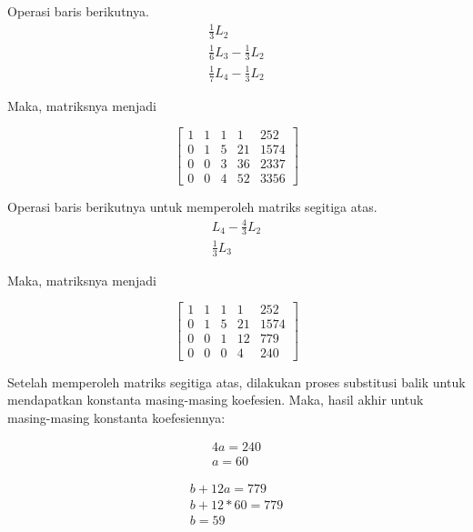 Operasi baris berikutnya.
\begin{align*}
	\frac{1}{3}L_2 \\
	\frac{1}{6}L_3 - \frac{1}{3}L_2 \\
	\frac{1}{7}L_4 - \frac{1}{3}L_2
\end{align*}

Maka, matriksnya menjadi

\begin{center}
	\setlength\arraycolsep{15pt}
	\[
	\begin{bmatrix}
			1 	& 1 	& 1 	& 1 		& 252 		\\[1em]
			0 	& 1 	& 5 	& 21 		& 1574			\\[1em]
			0 	& 0 	& 3 	& 36 		& 2337		\\[1em]
			0 	& 0 	& 4 	& 52 		& 3356
	\end{bmatrix}
	\]
\end{center}

Operasi baris berikutnya untuk memperoleh matriks segitiga atas.
\begin{align*}
	L_4 - \frac{4}{3}L_2 \\
	\frac{1}{3}L_3
\end{align*}

Maka, matriksnya menjadi

\begin{center}
	\setlength\arraycolsep{15pt}
	\[
	\begin{bmatrix}
			1 	& 1 	& 1 	& 1 		& 252 	\\[1em]
			0 	& 1 	& 5 	& 21 		& 1574	\\[1em]
			0 	& 0 	& 1 	& 12 		& 779		\\[1em]
			0 	& 0 	& 0 	& 4 		& 240
	\end{bmatrix}
	\]
\end{center}

Setelah memperoleh matriks segitiga atas, dilakukan proses substitusi balik untuk mendapatkan konstanta masing-masing koefesien. Maka, hasil akhir untuk masing-masing konstanta koefesiennya:

\begin{gather*}
	4a = 240 \\
	a = 60
\end{gather*}

\begin{gather*}
	b + 12a = 779 \\
	b + 12*60 = 779 \\
	b = 59
\end{gather*}

